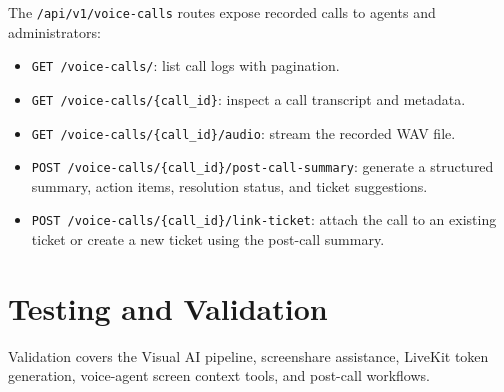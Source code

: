 The \texttt{/api/v1/voice-calls} routes expose recorded calls to agents and administrators:

\begin{itemize}
    \item \texttt{GET /voice-calls/}: list call logs with pagination.
    \item \texttt{GET /voice-calls/\{call\_id\}}: inspect a call transcript and metadata.
    \item \texttt{GET /voice-calls/\{call\_id\}/audio}: stream the recorded WAV file.
    \item \texttt{POST /voice-calls/\{call\_id\}/post-call-summary}: generate a structured summary, action items, resolution status, and ticket suggestions.
    \item \texttt{POST /voice-calls/\{call\_id\}/link-ticket}: attach the call to an existing ticket or create a new ticket using the post-call summary.
\end{itemize}

\section{Testing and Validation}

Validation covers the Visual AI pipeline, screenshare assistance, LiveKit token generation, voice-agent screen context tools, and post-call workflows.

